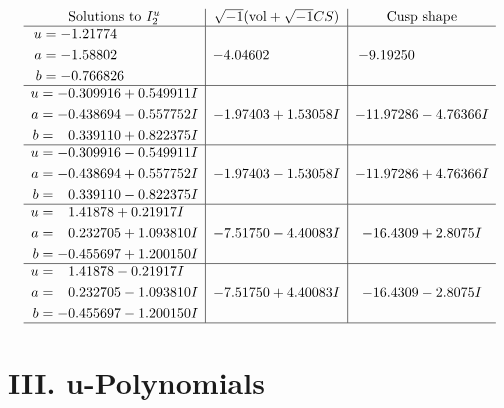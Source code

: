 \documentclass[1p]{elsarticle_modified}
\theoremstyle{definition}
\newcommand{\I}{\sqrt{-1}}
\begin{document}
$$\begin{array}{c|c|c}  
\text{Solutions to }I^u_{2}& \I (\text{vol} + \sqrt{-1}CS) & \text{Cusp shape}\\
 \hline 
\begin{aligned}
u &= -1.21774\phantom{ +0.000000I} \\
a &= -1.58802\phantom{ +0.000000I} \\
b &= -0.766826\phantom{ +0.000000I}\end{aligned}
 & -4.04602\phantom{ +0.000000I} & -9.19250\phantom{ +0.000000I} \\ \hline\begin{aligned}
u &= -0.309916 + 0.549911 I \\
a &= -0.438694 - 0.557752 I \\
b &= \phantom{-}0.339110 + 0.822375 I\end{aligned}
 & -1.97403 + 1.53058 I & -11.97286 - 4.76366 I \\ \hline\begin{aligned}
u &= -0.309916 - 0.549911 I \\
a &= -0.438694 + 0.557752 I \\
b &= \phantom{-}0.339110 - 0.822375 I\end{aligned}
 & -1.97403 - 1.53058 I & -11.97286 + 4.76366 I \\ \hline\begin{aligned}
u &= \phantom{-}1.41878 + 0.21917 I \\
a &= \phantom{-}0.232705 + 1.093810 I \\
b &= -0.455697 + 1.200150 I\end{aligned}
 & -7.51750 - 4.40083 I & -16.4309 + 2.8075 I \\ \hline\begin{aligned}
u &= \phantom{-}1.41878 - 0.21917 I \\
a &= \phantom{-}0.232705 - 1.093810 I \\
b &= -0.455697 - 1.200150 I\end{aligned}
 & -7.51750 + 4.40083 I & -16.4309 - 2.8075 I\\
 \hline 
 \end{array}$$\newpage
\newpage\renewcommand{\arraystretch}{1}
\centering \section*{ III. u-Polynomials}
\end{document}
